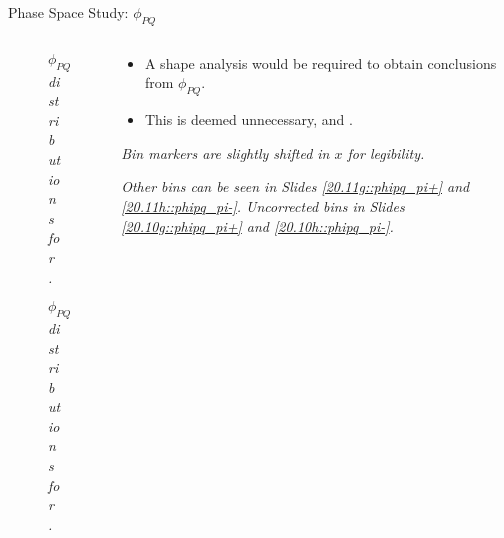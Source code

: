 \begin{frame}{Phase Space Study: $\phi_{PQ}$}
    \label{12.16::phipq}

    \begin{columns}[onlytextwidth,T]

    \begin{column}{.44\linewidth}
        \vspace{-15pt}
        \begin{center}
            \begin{figure}[t]
                \scriptsize{\textit{$\phi_{PQ}$ distributions for \ef{$\pi^-$}.}}
            \end{figure}

            \vspace{-15pt}
            \begin{figure}[t]
                \scriptsize{\textit{$\phi_{PQ}$ distributions for \ef{$\pi^+$}.}}
            \end{figure}
        \end{center}
    \end{column}

    \begin{column}{.54\linewidth}
        \begin{itemize}
            \item
                A shape analysis would be required to obtain conclusions from $\phi_{PQ}$.

            \vspace{12pt}
            \item
                This is deemed unnecessary, and .
        \end{itemize}

        \vspace{123pt}

        \begin{flushright}
            \tiny{\textit{Bin markers are slightly shifted in $x$ for legibility.}}

            \tiny{\textit{
                Other bins can be seen in Slides \textcolor{efd_purple}{\ref{20.11g::phipq_pi+}} and \textcolor{efd_purple}{\ref{20.11h::phipq_pi-}}.
                Uncorrected bins in Slides \textcolor{efd_purple}{\ref{20.10g::phipq_pi+}} and \textcolor{efd_purple}{\ref{20.10h::phipq_pi-}}.
            }}
        \end{flushright}
    \end{column}

    \end{columns}
\end{frame}

